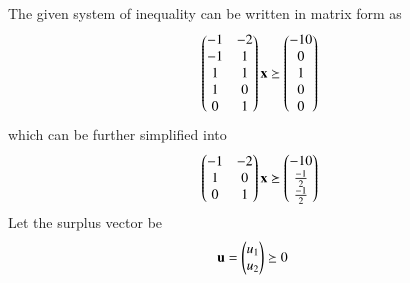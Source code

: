 
The given system of inequality can be written in matrix form as
\begin{align}
    \begin{pmatrix}-1 & -2  \\ -1 & 1 \\ 1 & 1\\ 1 & 0 \\ 0 & 1\end{pmatrix}\mathbf{x} \succeq \begin{pmatrix}-10\\0\\1\\0\\0\end{pmatrix}
\end{align}
which can be further simplified into 
\begin{align}
    \begin{pmatrix}-1 & -2 \\ 1 & 0 \\ 0&1\end{pmatrix}\mathbf{x} \succeq \begin{pmatrix}-10\\\frac{-1}{2}\\\frac{-1}{2}\end{pmatrix}
\end{align}
Let the surplus vector be
\begin{align}
    \mathbf{u} &= \begin{pmatrix}u_1\\u_2\end{pmatrix} \succeq 0
\end{align}
